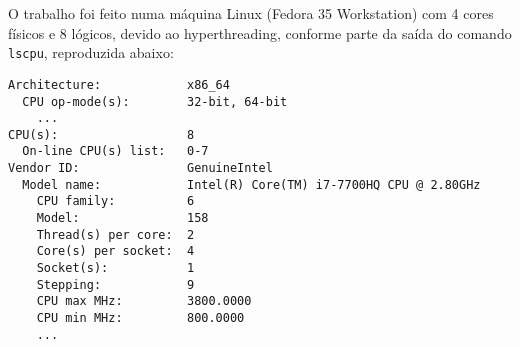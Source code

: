 \documentclass{article}
\begin{document}
\begin{large}
\end{large}

O trabalho foi feito numa máquina Linux (Fedora 35 Workstation) com 4 cores físicos e 8 lógicos, devido ao hyperthreading, conforme parte da saída do comando \texttt{lscpu}, reproduzida abaixo:

\begin{lstlisting}
Architecture:            x86_64
  CPU op-mode(s):        32-bit, 64-bit
    ...
CPU(s):                  8
  On-line CPU(s) list:   0-7
Vendor ID:               GenuineIntel
  Model name:            Intel(R) Core(TM) i7-7700HQ CPU @ 2.80GHz
    CPU family:          6
    Model:               158
    Thread(s) per core:  2
    Core(s) per socket:  4
    Socket(s):           1
    Stepping:            9
    CPU max MHz:         3800.0000
    CPU min MHz:         800.0000
    ...
\end{lstlisting}
\end{document}
